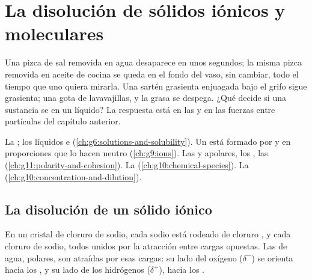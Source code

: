 \chapter{La disolución de sólidos iónicos y moleculares}\label{ch:g11:dissolution}

Una pizca de sal removida en agua desaparece en unos segundos; la misma
pizca removida en aceite de cocina se queda en el fondo del vaso, sin
cambiar, todo el tiempo que uno quiera mirarla. Una sartén grasienta
enjuagada bajo el grifo sigue grasienta; una gota de lavavajillas, y la
grasa se despega. ¿Qué decide si una sustancia se  en un
líquido? La respuesta está en las  y en las fuerzas
entre partículas del capítulo anterior.

\begin{recall}
La ; los líquidos  e 
(\cref{ch:g6:solutions-and-solubility}). Un  está
formado por  y  en proporciones que lo hacen neutro
(\cref{ch:g9:ions}). Las  y apolares, los , las 
(\cref{ch:g11:polarity-and-cohesion}). La 
(\cref{ch:g10:chemical-species}). La 
(\cref{ch:g10:concentration-and-dilution}).
\end{recall}

\section{La disolución de un sólido iónico}

En un cristal de cloruro de sodio, cada  sodio  está rodeado
de  cloruro , y cada  cloruro de  sodio, todos
unidos por la atracción entre cargas opuestas. Las  de agua,
polares, son atraídas por esas cargas: su lado del oxígeno ($\delta^-$)
se orienta hacia los , y su lado de los hidrógenos ($\delta^+$),
hacia los .

